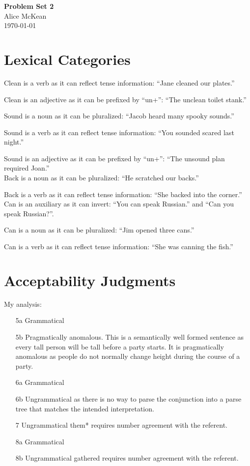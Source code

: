 \documentclass[20pt]{article}
\begin{document}
\Large\textbf{Problem Set 2} \\
\normalsize
Alice McKean \\
\today


\section{Lexical Categories}
Clean is a verb as it can reflect tense information: ``Jane cleaned our plates.''

Clean is an adjective as it can be prefixed by ``un+'':
``The unclean toilet stank.'' \\

\par

Sound is a noun as it can be pluralized: ``Jacob heard many spooky sounds.''

Sound is a verb as it can reflect tense information: ``You sounded scared last night.''

Sound is an adjective as it can be prefixed by ``un+'': ``The unsound plan
required Joan.'' \\


Back is a noun as it can be pluralized: ``He scratched our backs.''

Back is a verb as it can reflect tense information:
``She backed into the corner.'' \\


Can is an auxiliary as it can invert: ``You can speak Russian.'' and
``Can you speak Russian?''.

Can is a noun as it can be pluralized: ``Jim opened three cans.''

Can is a verb as it can reflect tense information: ``She was canning the fish.''

\section{Acceptability Judgments}  

My analysis:
\begin{enumerate}
  \itemsep0em 
  \item[5a] Grammatical
  \item[5b] Pragmatically anomalous. This is a semantically well formed sentence as
    every tall person will be tall before a party starts. It is pragmatically
    anomalous as people do not normally change height during the course of a
    party.
  \item[6a] Grammatical
  \item[6b] Ungrammatical as there is no way to parse the conjunction into a
    parse tree that matches the intended interpretation.
  \item[7]  Ungrammatical them* requires number agreement with the referent.
  \item[8a] Grammatical
  \item[8b] Ungrammatical gathered requires number agreement with the referent.
\end{enumerate}
\end{document}
